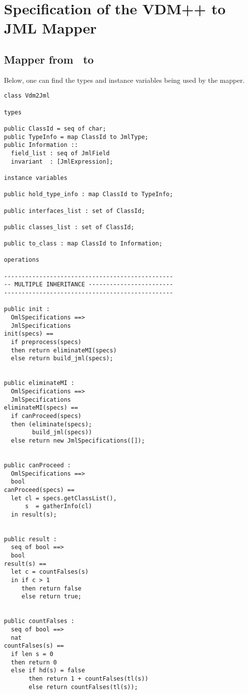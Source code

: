 \chapter{Specification of the VDM++ to JML Mapper}
\label{appendix2}


\section{Mapper from \vpp\ to \jml}

Below, one can find the types and instance variables being used by the mapper.
\lstset{language=VDM++}
\lstset{style=mystyle}
\bigskip
\begin{lstlisting}
class Vdm2Jml

types

public ClassId = seq of char;
public TypeInfo = map ClassId to JmlType;
public Information ::
  field_list : seq of JmlField
  invariant  : [JmlExpression];

instance variables

public hold_type_info : map ClassId to TypeInfo;

public interfaces_list : set of ClassId;

public classes_list : set of ClassId;

public to_class : map ClassId to Information;

operations

------------------------------------------------
-- MULTIPLE INHERITANCE ------------------------
------------------------------------------------

public init :
  OmlSpecifications ==>
  JmlSpecifications
init(specs) ==
  if preprocess(specs) 
  then return eliminateMI(specs)
  else return build_jml(specs);
	 
	 
public eliminateMI : 
  OmlSpecifications ==>
  JmlSpecifications
eliminateMI(specs) == 
  if canProceed(specs)
  then (eliminate(specs);
        build_jml(specs))
  else return new JmlSpecifications([]);


public canProceed : 
  OmlSpecifications ==>
  bool
canProceed(specs) == 
  let cl = specs.getClassList(),
      s  = gatherInfo(cl)
  in result(s);
  
  
public result :
  seq of bool ==>
  bool
result(s) ==
  let c = countFalses(s)
  in if c > 1
     then return false
	 else return true;


public countFalses :
  seq of bool ==>
  nat
countFalses(s) ==
  if len s = 0
  then return 0
  else if hd(s) = false
       then return 1 + countFalses(tl(s))
	   else return countFalses(tl(s));
  

\end{lstlisting}
